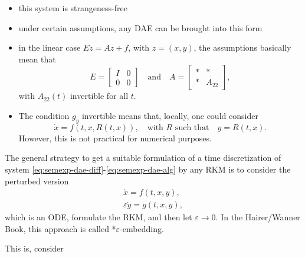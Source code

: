 \documentclass[]{book}
\providecommand{\tightlist}{%
  \setlength{\itemsep}{0pt}\setlength{\parskip}{0pt}}
\theoremstyle{definition}
\theoremstyle{definition}
\theoremstyle{definition}
\theoremstyle{definition}
\theoremstyle{remark}
\begin{document}
\begin{itemize}
\tightlist
\item
  this system is strangeness-free
\item
  under certain assumptions, any DAE can be brought into this form
\item
  in the linear case \(E\dot z = Az +f\), with \(z=(x,y)\), the assumptions basically mean that
  \[
   E = \begin{bmatrix} I & 0 \\ 0 & 0 \end{bmatrix} \quad\text{and}\quad 
   A = \begin{bmatrix} * & * \\ * & A_{22} \end{bmatrix},
  \]
  with \(A_{22}(t)\) invertible for all \(t\).
\item
  The condition \(g_y\) invertible means that, locally, one could consider
  \[
   \dot x = f(t, x, R(t,x)), \quad\text{with $R$ such that}\quad y=R(t,x).
  \]
  However, this is not practical for numerical purposes.
\end{itemize}

The general strategy to get a suitable formulation of a time discretization of system \eqref{eq:semexp-dae-diff}-\eqref{eq:semexp-dae-alg} by any RKM is to consider the perturbed version
\begin{align*}
\dot x = f(t, x, y),  \\
\varepsilon \dot y = g(t, x, y),
\end{align*}
which is an ODE, formulate the RKM, and then let \(\varepsilon \to 0\). In the Hairer/Wanner Book, this approach is called *\(\varepsilon\)-embedding.

This is, consider
\end{document}
